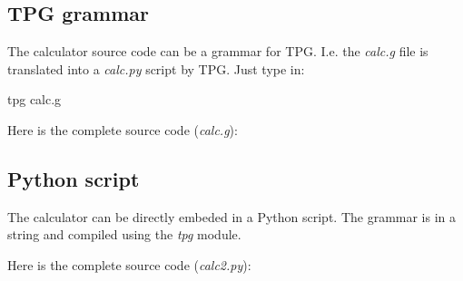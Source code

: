 \subsection{TPG grammar}

The calculator source code can be a grammar for TPG.
I.e. the \emph{calc.g} file is translated into a \emph{calc.py} script by TPG.
Just type in:
\begin{verbatimtab}[4]
	tpg calc.g
\end{verbatimtab}

Here is the complete source code (\emph{calc.g}):


\subsection{Python script}

The calculator can be directly embeded in a Python script.
The grammar is in a string and compiled using the \emph{tpg} module.

Here is the complete source code (\emph{calc2.py}):

